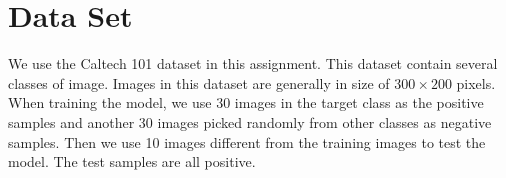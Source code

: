 \section{Data Set}

We use the Caltech 101 dataset in this assignment. This dataset contain several classes of image. 
Images in this dataset are generally in size of $300 \times 200$ pixels. 
When training the model, 
we use 30 images in the target class as the positive samples and another 30 images picked randomly from other classes as negative samples.
Then we use 10 images different from the training images to test the model. The test samples are all positive.

